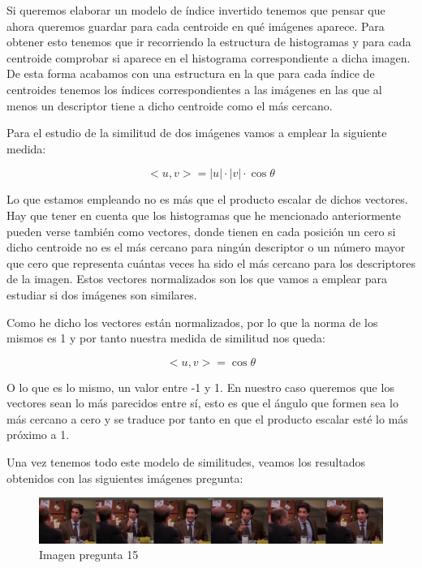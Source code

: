 \documentclass[12pt,a4paper]{article}
\begin{document}
\vspace{10px}

Si queremos elaborar un modelo de índice invertido tenemos que pensar que ahora queremos guardar para cada centroide en qué imágenes aparece. Para obtener esto tenemos que ir recorriendo la estructura de histogramas y para cada centroide comprobar si aparece en el histograma correspondiente a dicha imagen. De esta forma acabamos con una estructura en la que para cada índice de centroides tenemos los índices correspondientes a las imágenes en las que al menos un descriptor tiene a dicho centroide como el más cercano.

\vspace{10px}

Para el estudio de la similitud de dos imágenes vamos a emplear la siguiente medida:

$$<u,v> = |u|\cdot |v|\cdot \cos{\theta}$$

Lo que estamos empleando no es más que el producto escalar de dichos vectores. Hay que tener en cuenta que los histogramas que he mencionado anteriormente pueden verse también como vectores, donde tienen en cada posición un cero si dicho centroide no es el más cercano para ningún descriptor o un número mayor que cero que representa cuántas veces ha sido el más cercano para los descriptores de la imagen. Estos vectores normalizados son los que vamos a emplear para estudiar si dos imágenes son similares.

\vspace{10px}

Como he dicho los vectores están normalizados, por lo que la norma de los mismos es 1 y por tanto nuestra medida de similitud nos queda:

$$<u,v> = \cos{\theta}$$

O lo que es lo mismo, un valor entre -1 y 1. En nuestro caso queremos que los vectores sean lo más parecidos entre sí, esto es que el ángulo que formen sea lo más cercano a cero y se traduce por tanto en que el producto escalar esté lo más próximo a 1.

\vspace{10px}

Una vez tenemos todo este modelo de similitudes, veamos los resultados obtenidos con las siguientes imágenes pregunta:

\begin{figure}[H]
  \centering
  \includegraphics[scale=0.135]{./Imagenes/Ejercicio2-1.png}
  \caption{Imagen pregunta 15}
	\label{Ejercicio2-1}
\end{figure}
\end{document}
